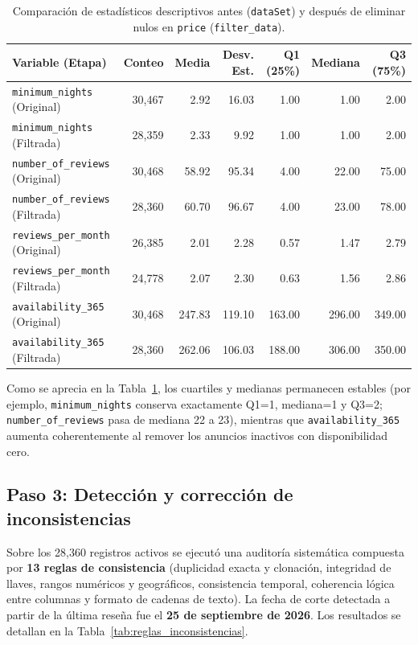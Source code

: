 \documentclass[12pt,letterpaper,oneside]{report}
\begin{document}
\begin{table}[htbp]
\centering
\caption{Comparación de estadísticos descriptivos antes (\texttt{dataSet}) y después de eliminar nulos en \texttt{price} (\texttt{filter\_data}).}
\label{tab:comp_nulos}
\scriptsize
\renewcommand{\arraystretch}{1.15}
\begin{tabular}{l r r r r r r}
\toprule
\rowcolor{TableHeader}
\textbf{Variable (Etapa)} & \textbf{Conteo} & \textbf{Media} & \textbf{Desv. Est.} & \textbf{Q1 (25\%)} & \textbf{Mediana} & \textbf{Q3 (75\%)} \\
\midrule
\texttt{minimum\_nights} (Original) & 30,467 & 2.92 & 16.03 & 1.00 & 1.00 & 2.00 \\
\texttt{minimum\_nights} (Filtrada) & 28,359 & 2.33 &  9.92 & 1.00 & 1.00 & 2.00 \\
\midrule
\texttt{number\_of\_reviews} (Original) & 30,468 & 58.92 & 95.34 & 4.00 & 22.00 & 75.00 \\
\texttt{number\_of\_reviews} (Filtrada) & 28,360 & 60.70 & 96.67 & 4.00 & 23.00 & 78.00 \\
\midrule
\texttt{reviews\_per\_month} (Original) & 26,385 & 2.01 & 2.28 & 0.57 & 1.47 & 2.79 \\
\texttt{reviews\_per\_month} (Filtrada) & 24,778 & 2.07 & 2.30 & 0.63 & 1.56 & 2.86 \\
\midrule
\texttt{availability\_365} (Original) & 30,468 & 247.83 & 119.10 & 163.00 & 296.00 & 349.00 \\
\texttt{availability\_365} (Filtrada) & 28,360 & 262.06 & 106.03 & 188.00 & 306.00 & 350.00 \\
\bottomrule
\end{tabular}
\end{table}

Como se aprecia en la Tabla~\ref{tab:comp_nulos}, los cuartiles y medianas permanecen estables (por ejemplo, \texttt{minimum\_nights} conserva exactamente Q1=1, mediana=1 y Q3=2; \texttt{number\_of\_reviews} pasa de mediana 22 a 23), mientras que \texttt{availability\_365} aumenta coherentemente al remover los anuncios inactivos con disponibilidad cero.

\subsection{Paso 3: Detección y corrección de inconsistencias}
\label{subsec:paso3}

Sobre los 28,360 registros activos se ejecutó una auditoría sistemática compuesta por \textbf{13 reglas de consistencia} (duplicidad exacta y clonación, integridad de llaves, rangos numéricos y geográficos, consistencia temporal, coherencia lógica entre columnas y formato de cadenas de texto). La fecha de corte detectada a partir de la última reseña fue el \textbf{25 de septiembre de 2026}. Los resultados se detallan en la Tabla~\ref{tab:reglas_inconsistencias}.
\end{document}
